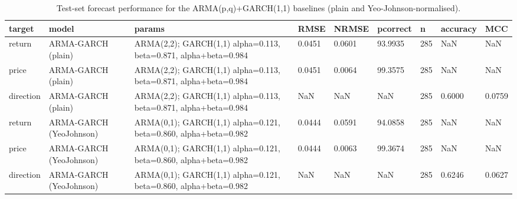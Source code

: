 \begin{table}[H]
\centering
\small
\begin{tabular}{lllllllll}
\toprule
target & model & params & RMSE & NRMSE & pcorrect & n & accuracy & MCC \\
\midrule
return & ARMA-GARCH (plain) & ARMA(2,2); GARCH(1,1) alpha=0.113, beta=0.871, alpha+beta=0.984 & 0.0451 & 0.0601 & 93.9935 & 285 & NaN & NaN \\
price & ARMA-GARCH (plain) & ARMA(2,2); GARCH(1,1) alpha=0.113, beta=0.871, alpha+beta=0.984 & 0.0451 & 0.0064 & 99.3575 & 285 & NaN & NaN \\
direction & ARMA-GARCH (plain) & ARMA(2,2); GARCH(1,1) alpha=0.113, beta=0.871, alpha+beta=0.984 & NaN & NaN & NaN & 285 & 0.6000 & 0.0759 \\
return & ARMA-GARCH (YeoJohnson) & ARMA(0,1); GARCH(1,1) alpha=0.121, beta=0.860, alpha+beta=0.982 & 0.0444 & 0.0591 & 94.0858 & 285 & NaN & NaN \\
price & ARMA-GARCH (YeoJohnson) & ARMA(0,1); GARCH(1,1) alpha=0.121, beta=0.860, alpha+beta=0.982 & 0.0444 & 0.0063 & 99.3674 & 285 & NaN & NaN \\
direction & ARMA-GARCH (YeoJohnson) & ARMA(0,1); GARCH(1,1) alpha=0.121, beta=0.860, alpha+beta=0.982 & NaN & NaN & NaN & 285 & 0.6246 & 0.0627 \\
\bottomrule
\end{tabular}
\caption{Test-set forecast performance for the ARMA(p,q)+GARCH(1,1) baselines (plain and Yeo-Johnson-normalised).}
\label{tab:ex3_metrics}
\end{table}
